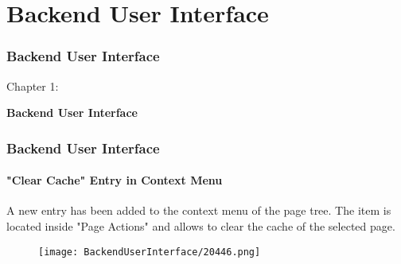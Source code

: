 %

\section{Backend User Interface}
\begin{frame}[fragile]
	\frametitle{Backend User Interface}

	\begin{center}\huge{Chapter 1:}\end{center}
	\begin{center}\huge{\color{typo3darkgrey}\textbf{Backend User Interface}}\end{center}

\end{frame}

\begin{frame}[fragile]
	\frametitle{Backend User Interface}
	\framesubtitle{"Clear Cache" Entry in Context Menu}

	A new entry has been added to the context menu of the page tree. The item is located inside "Page Actions"
	and allows to clear the cache of the selected page.

	\begin{figure}
		\texttt{[image: BackendUserInterface/20446.png]}
	\end{figure}

\end{frame}

